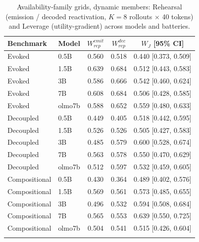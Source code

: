 \begin{table}[h]
\centering
\caption{Availability-family grids, dynamic members: Rehearsal (emission /
decoded reactivation, $K{=}8$ rollouts $\times$ 40 tokens) and Leverage
(utility-gradient) across models and batteries.}
\label{tab:appA7}
\small
\begin{tabular}{llccc}
\toprule
Benchmark & Model & $W_{rep}^{emit}$ & $W_{rep}^{dec}$ & $W_J$ [95\% CI] \\
\midrule
Evoked & 0.5B & 0.560 & 0.518 & 0.440 [0.373, 0.509] \\
Evoked & 1.5B & 0.639 & 0.684 & 0.512 [0.443, 0.583] \\
Evoked & 3B & 0.586 & 0.666 & 0.542 [0.460, 0.624] \\
Evoked & 7B & 0.608 & 0.684 & 0.506 [0.428, 0.585] \\
Evoked & olmo7b & 0.588 & 0.652 & 0.559 [0.480, 0.633] \\
\addlinespace
Decoupled & 0.5B & 0.449 & 0.405 & 0.518 [0.442, 0.595] \\
Decoupled & 1.5B & 0.526 & 0.526 & 0.505 [0.427, 0.583] \\
Decoupled & 3B & 0.485 & 0.579 & 0.600 [0.528, 0.674] \\
Decoupled & 7B & 0.563 & 0.578 & 0.550 [0.470, 0.629] \\
Decoupled & olmo7b & 0.512 & 0.597 & 0.532 [0.459, 0.605] \\
\addlinespace
Compositional & 0.5B & 0.430 & 0.364 & 0.489 [0.402, 0.576] \\
Compositional & 1.5B & 0.569 & 0.561 & 0.573 [0.485, 0.655] \\
Compositional & 3B & 0.496 & 0.532 & 0.594 [0.508, 0.684] \\
Compositional & 7B & 0.565 & 0.553 & 0.639 [0.550, 0.725] \\
Compositional & olmo7b & 0.504 & 0.541 & 0.515 [0.426, 0.604] \\
\addlinespace
\bottomrule
\end{tabular}
\end{table}
